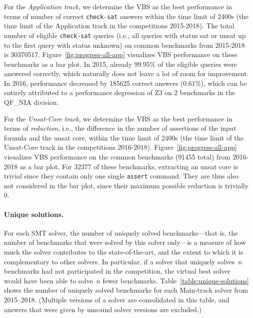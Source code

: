 \documentclass[dvipsnames,table,twoside,11pt]{article}
\begin{document}
For the \emph{Application track}, we determine the VBS as the best performance
in terms of number of correct \texttt{check-sat} answers within the time limit
of 2400s (the time limit of the Application track in the competitions
2015-2018).
The total number of eligible \texttt{check-sat} queries (i.e., all queries with
status sat or unsat up to the first query with status unknown) on
common benchmarks from 2015-2018 is 30370517.
Figure~\ref{fig:progress-all-app} visualizes VBS performance on these
benchmarks as a bar plot.
In 2015, already 99.95\% of the eligible queries were answered correctly,
which naturally does not leave a lot of room for improvement.
In 2016, performance decreased by 185625 correct answers (0.61\%),
which can be entirely attributed to a performance degression
of Z3 on 2 benchmarks in the QF\_NIA division.

For the \emph{Unsat-Core track}, we determine the VBS as the best performance in
terms of \emph{reduction}, i.e., the difference in the number of assertions
of the input formula and the unsat core, within the time limit
of 2400s (the time limit of the Unsat-Core track in the competitions
2016-2018).
Figure~\ref{fig:progress-all-app} visualizes VBS performance on the common
benchmarks (91455 total) from 2016-2018 as a bar plot.
For 32377 of these benchmarks, extracting an unsat core is trivial since
they contain only one single \texttt{assert} command.
They are thus also not considered in the bar plot, since their maximum
possible reduction is trivially 0.


\paragraph{Unique solutions.}

For each SMT solver, the number of uniquely solved benchmarks---that
is, the number of benchmarks that were solved by this solver only---is
a measure of how much the solver contributes to the state-of-the-art,
and the extent to which it is complementary to other solvers.  In
particular, if a solver that uniquely solves~$n$ benchmarks had not
participated in the competition, the virtual best solver would have
been able to solve~$n$ fewer benchmarks.
Table~\ref{table:unique-solutions} shows the number of uniquely solved
benchmarks for each Main-track solver from 2015--2018.  (Multiple
versions of a solver are consolidated in this table, and answers that
were given by unsound solver versions are excluded.)
\end{document}
